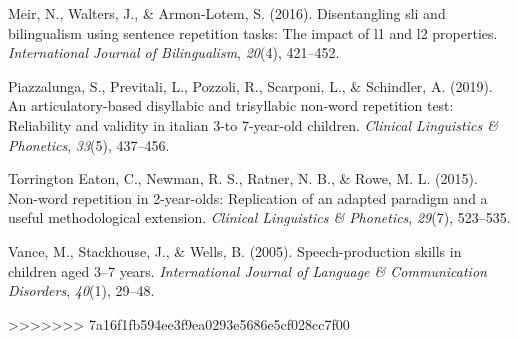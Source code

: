 \documentclass[english,,man,floatsintext]{apa6}
\begin{document}
\leavevmode\hypertarget{ref-meir2016disentangling}{}%
Meir, N., Walters, J., \& Armon-Lotem, S. (2016). Disentangling sli and bilingualism using sentence repetition tasks: The impact of l1 and l2 properties. \emph{International Journal of Bilingualism}, \emph{20}(4), 421--452.

\leavevmode\hypertarget{ref-piazzalunga2019articulatory}{}%
Piazzalunga, S., Previtali, L., Pozzoli, R., Scarponi, L., \& Schindler, A. (2019). An articulatory-based disyllabic and trisyllabic non-word repetition test: Reliability and validity in italian 3-to 7-year-old children. \emph{Clinical Linguistics \& Phonetics}, \emph{33}(5), 437--456.

\leavevmode\hypertarget{ref-torrington2015non}{}%
Torrington Eaton, C., Newman, R. S., Ratner, N. B., \& Rowe, M. L. (2015). Non-word repetition in 2-year-olds: Replication of an adapted paradigm and a useful methodological extension. \emph{Clinical Linguistics \& Phonetics}, \emph{29}(7), 523--535.

\leavevmode\hypertarget{ref-vance2005speech}{}%
Vance, M., Stackhouse, J., \& Wells, B. (2005). Speech-production skills in children aged 3--7 years. \emph{International Journal of Language \& Communication Disorders}, \emph{40}(1), 29--48.


>>>>>>> 7a16f1fb594ee3f9ea0293e5686e5cf028cc7f00
\end{document}
